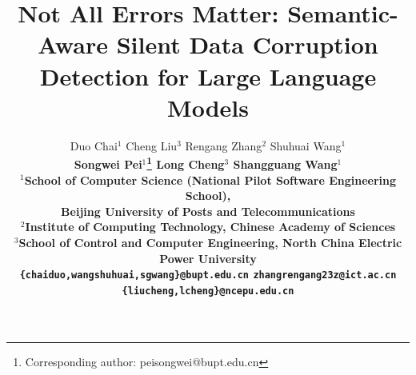 \documentclass{article} %
\title{Not All Errors Matter: Semantic-Aware Silent Data Corruption Detection for Large Language Models}
\author{
Duo Chai$^{1}$ \quad
Cheng Liu$^{3}$ \quad
Rengang Zhang$^{2}$ \quad
Shuhuai Wang$^{1}$ \\
\bfseries Songwei Pei$^{1}$\thanks{Corresponding author: peisongwei@bupt.edu.cn} \quad
Long Cheng$^{3}$ \quad
Shangguang Wang$^{1}$ \\[2pt]
$^{1}$School of Computer Science (National Pilot Software Engineering School),\\
Beijing University of Posts and Telecommunications \\
$^{2}$Institute of Computing Technology, Chinese Academy of Sciences \\
$^{3}$School of Control and Computer Engineering, North China Electric Power University \\
\texttt{\{chaiduo,wangshuhuai,sgwang\}@bupt.edu.cn} \quad
\texttt{zhangrengang23z@ict.ac.cn} \\
\texttt{\{liucheng,lcheng\}@ncepu.edu.cn}
}
\begin{document}
\maketitle















\appendix
\renewcommand{\thetable}{A\arabic{table}}
\setcounter{table}{0}
\renewcommand{\thefigure}{A\arabic{figure}}
\setcounter{figure}{0}









\end{document}
